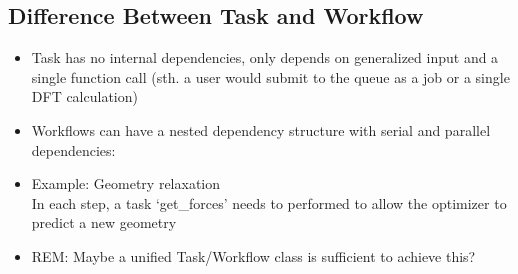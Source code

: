 \documentclass [notitlepage, 12pt, a4paper]{article}
\begin{document}
\subsection{Difference Between Task and Workflow}
\begin{itemize}
\item Task has no internal dependencies, only depends on generalized input and a single function call (sth. a user would submit to the queue as a job or a single DFT calculation)
\item Workflows can have a nested dependency structure with serial and parallel dependencies:
\item Example: Geometry relaxation\\
In each step, a task ‘get\_forces’ needs to performed to allow the optimizer to predict a new geometry
\item \textcolor{deepred}{REM: Maybe a unified Task/Workflow class is sufficient to achieve this?}
\end{itemize}
\end{document}
